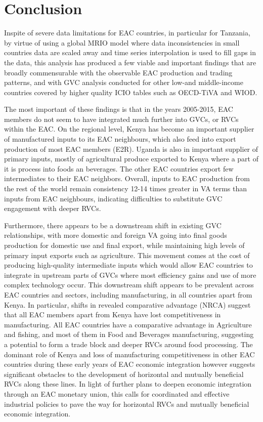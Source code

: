 \documentclass[a4paper]{article}
\begin{document}
\section{Conclusion} 

Inspite of severe data limitations for EAC countries, in particular for Tanzania, by virtue of using a global MRIO model where data inconsistencies in small countries data are scaled away and time series interpolation is used to fill gaps in the data, this analysis has produced a few viable and important findings that are broadly commensurable with the observable EAC production and trading patterns, and  with GVC analysis conducted for other low-and middle-income countries covered by higher quality ICIO tables such as OECD-TiVA and WIOD. \newline

The most important of these findings is that in the years 2005-2015, EAC members do not seem to have integrated much further into GVCs, or RVCs within the EAC. On the regional level, Kenya has become an important supplier of manufactured inputs to its EAC neighbours, which also feed into export production of most EAC members (E2R). Uganda is also in important supplier of primary inputs, mostly of agricultural produce exported to Kenya where a part of it is process into foods an beverages. The other EAC countries export few intermediates to their EAC neighbors. Overall, inputs to EAC production from the rest of the world remain consistency 12-14 times greater in VA terms than inputs from EAC neighbours, indicating difficulties to substitute GVC engagement with deeper RVCs.  \newline

Furthermore, there appears to be a downstream shift in existing GVC relationships, with more domestic and foreign VA going into final goods production for domestic use and final export, while maintaining high levels of primary input exports such as agriculture. This movement comes at the cost of producing high-quality intermediate inputs which would allow EAC countries to integrate in upstream parts of GVCs where most efficiency gains and use of more complex technology occur. This downstream shift appears to be prevalent across EAC countries and sectors, including manufacturing, in all countries apart from Kenya. In particular, shifts in revealed comparative advantage (NRCA) suggest that all EAC members apart from Kenya have lost competitiveness in manufacturing. All EAC countries have a comparative advantage in Agriculture and fishing, and most of them in Food and Beverages manufacturing, suggesting a potential to form a trade block and deeper RVCs around food processing. The dominant role of Kenya and loss of manufacturing competitiveness in other EAC countries during these early years of EAC economic integration however suggests significant obstacles to the development of horizontal and mutually beneficial RVCs along these lines. In light of further plans to deepen economic integration through an EAC monetary union, this calls for coordinated and effective industrial policies to pave the way for horizontal RVCs and mutually beneficial economic integration. \newline 
\end{document}
